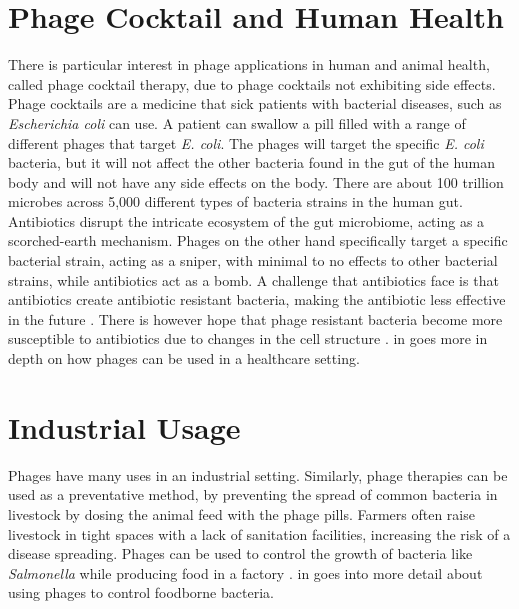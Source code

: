\section{Phage Cocktail and Human Health}
There is particular interest in phage applications in human and animal health, called phage cocktail therapy, due to phage cocktails not exhibiting side effects.
Phage cocktails are a medicine that sick patients with bacterial diseases, such as \textit{Escherichia coli} can use. 
A patient can swallow a pill filled with a range of different phages that target \textit{E. coli}.
The phages will target the specific \textit{E. coli} bacteria, but it will not affect the other bacteria found in the gut of the human body and will not have any side effects on the body. 
There are about 100 trillion microbes across 5,000 different types of bacteria strains in the human gut. 
Antibiotics disrupt the intricate ecosystem of the gut microbiome, acting as a scorched-earth mechanism. 
Phages on the other hand specifically target a specific bacterial strain, acting as a sniper, with minimal to no effects to other bacterial strains, while antibiotics act as a bomb. 
A challenge that antibiotics face is that antibiotics create antibiotic resistant bacteria, making the antibiotic less effective in the future \cite{odonkorBacteriaResistanceAntibiotics2011, volkovaEffectsEarlylifePenicillin2021}. 
There is however hope that phage resistant bacteria become more susceptible to antibiotics due to changes in the cell structure \cite{laurePhageResistancemediatedTradeoffs2022, zhaoPhagedrivenCoevolutionReveals2024}. 
 in  goes more in depth on how phages can be used in a healthcare setting. 

\section{Industrial Usage}
Phages have many uses in an industrial setting. 
Similarly, phage therapies can be used as a preventative method, by preventing the spread of common bacteria in livestock by dosing the animal feed with the phage pills. 
Farmers often raise livestock in tight spaces with a lack of sanitation facilities, increasing the risk of a disease spreading. \newline 
Phages can be used to control the growth of bacteria like \textit{Salmonella} while producing food in a factory \cite{sofferBacteriophagesSafelyReduce2016, kowalskaFreshVegetablesFruit2023}. 
 in  goes into more detail about using phages to control foodborne bacteria. 

